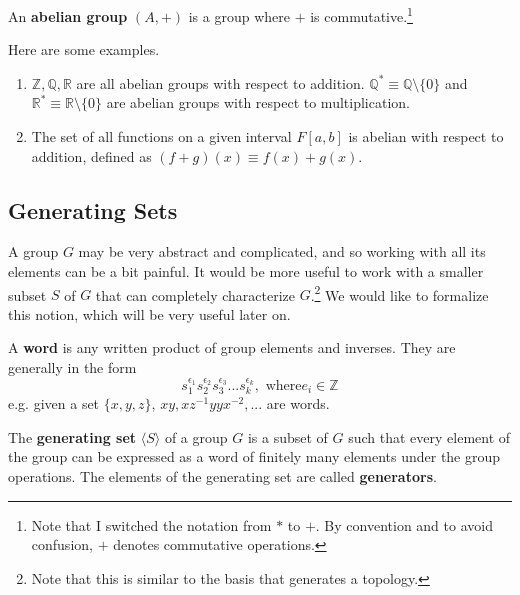   \begin{definition}
    An \textbf{abelian group} $(A, +)$ is a group where $+$ is commutative.\footnote{Note that I switched the notation from $\ast$ to $+$. By convention and to avoid confusion, $+$ denotes commutative operations. }
  \end{definition}

  \begin{example}
    Here are some examples. 
    \begin{enumerate}
      \item $\mathbb{Z}, \mathbb{Q}, \mathbb{R}$ are all abelian groups with respect to addition. $\mathbb{Q}^{*} \equiv \mathbb{Q} \setminus \{0\}$ and $\mathbb{R}^{*} \equiv \mathbb{R} \setminus \{0\}$ are abelian groups with respect to multiplication.
      \item The set of all functions on a given interval $F[a,b]$ is abelian with respect to addition, defined as $(f+g)(x) \equiv f(x) + g(x)$. 
    \end{enumerate}
  \end{example}

\subsection{Generating Sets}

  A group $G$ may be very abstract and complicated, and so working with all its elements can be a bit painful. It would be more useful to work with a smaller subset $S$ of $G$ that can completely characterize $G$.\footnote{Note that this is similar to the basis that generates a topology.} We would like to formalize this notion, which will be very useful later on. 

  \begin{definition}[Word]
    A \textbf{word} is any written product of group elements and inverses. They are generally in the form
    \begin{equation}
      s_{1}^{\epsilon_{1}} s_{2}^{\epsilon_{2}} s_{3}^{\epsilon_{3}}... s_{k}^{\epsilon_{k}}, \text{ where} e_i \in \mathbb{Z}
    \end{equation} 
    e.g. given a set $\{x,y,z\}$, $x y, x z^{-1} y y x^{-2},...$ are words. 
  \end{definition}

  \begin{definition}
    The \textbf{generating set} $\langle S \rangle$ of a group $G$ is a subset of $G$ such that every element of the group can be expressed as a word of finitely many elements under the group operations. The elements of the generating set are called \textbf{generators}.
  \end{definition}

